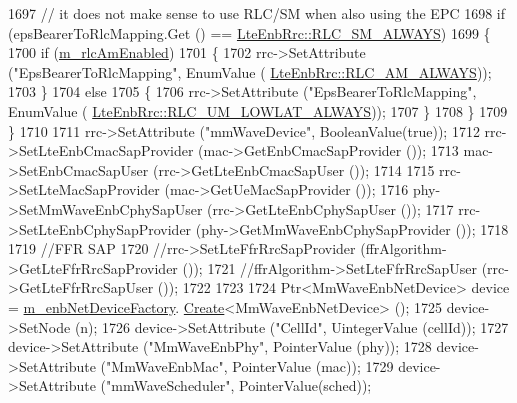 \begin{DoxyCode}
1697                 \textcolor{comment}{// it does not make sense to use RLC/SM when also using the EPC}
1698                 \textcolor{keywordflow}{if} (epsBearerToRlcMapping.Get () == \hyperlink{classns3_1_1LteEnbRrc_a1c748bf2d69860b866dfda2a38427842aacda149c15c085eb654d411b64f62770}{LteEnbRrc::RLC\_SM\_ALWAYS})
1699                 \{
1700                         \textcolor{keywordflow}{if} (\hyperlink{classns3_1_1MmWaveHelper_a47e5d8166922f0be28d1e29e18d2e1f9}{m\_rlcAmEnabled})
1701                         \{
1702                                 rrc->SetAttribute (\textcolor{stringliteral}{"EpsBearerToRlcMapping"}, EnumValue (
      \hyperlink{classns3_1_1LteEnbRrc_a1c748bf2d69860b866dfda2a38427842a3cdf85c3ca2f87b1775fde37d95d0ace}{LteEnbRrc::RLC\_AM\_ALWAYS}));
1703                         \}
1704                         \textcolor{keywordflow}{else}
1705                         \{
1706                                 rrc->SetAttribute (\textcolor{stringliteral}{"EpsBearerToRlcMapping"}, EnumValue (
      \hyperlink{classns3_1_1LteEnbRrc_a1c748bf2d69860b866dfda2a38427842a57f0cbeb7cbaf285166a276e0572c8f4}{LteEnbRrc::RLC\_UM\_LOWLAT\_ALWAYS}));
1707                         \}
1708                 \}
1709         \}
1710 
1711         rrc->SetAttribute (\textcolor{stringliteral}{"mmWaveDevice"}, BooleanValue(\textcolor{keyword}{true}));
1712         rrc->SetLteEnbCmacSapProvider (mac->GetEnbCmacSapProvider ());
1713         mac->SetEnbCmacSapUser (rrc->GetLteEnbCmacSapUser ());
1714 
1715         rrc->SetLteMacSapProvider (mac->GetUeMacSapProvider ());
1716         phy->SetMmWaveEnbCphySapUser (rrc->GetLteEnbCphySapUser ());
1717         rrc->SetLteEnbCphySapProvider (phy->GetMmWaveEnbCphySapProvider ());
1718 
1719         \textcolor{comment}{//FFR SAP}
1720         \textcolor{comment}{//rrc->SetLteFfrRrcSapProvider (ffrAlgorithm->GetLteFfrRrcSapProvider ());}
1721         \textcolor{comment}{//ffrAlgorithm->SetLteFfrRrcSapUser (rrc->GetLteFfrRrcSapUser ());}
1722 
1723 
1724         Ptr<MmWaveEnbNetDevice> device = \hyperlink{classns3_1_1MmWaveHelper_adaf4ba456a6dda3d359b5105a0df1c22}{m\_enbNetDeviceFactory}.
      \hyperlink{classns3_1_1ObjectFactory_a18152e93f0a6fe184ed7300cb31e9896}{Create}<MmWaveEnbNetDevice> ();
1725         device->SetNode (n);
1726         device->SetAttribute (\textcolor{stringliteral}{"CellId"}, UintegerValue (cellId));
1727         device->SetAttribute (\textcolor{stringliteral}{"MmWaveEnbPhy"}, PointerValue (phy));
1728         device->SetAttribute (\textcolor{stringliteral}{"MmWaveEnbMac"}, PointerValue (mac));
1729         device->SetAttribute (\textcolor{stringliteral}{"mmWaveScheduler"}, PointerValue(sched));

\end{DoxyCode}
